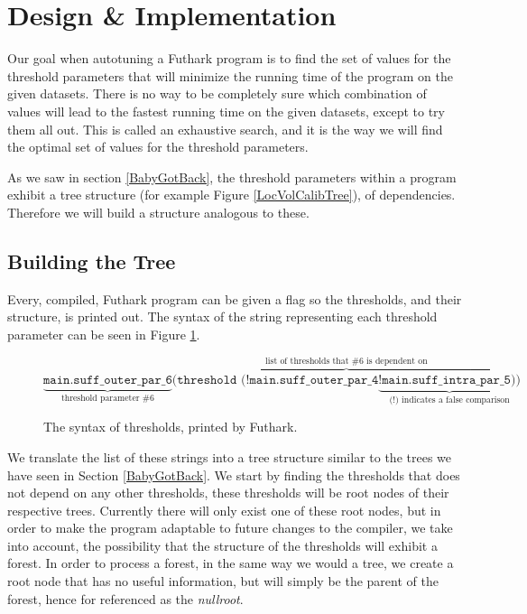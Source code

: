 \section{Design \& Implementation}
\label{imp}
Our goal when autotuning a Futhark program is to find the set of values for the
threshold parameters that will minimize the running time of the program on the
given datasets. There is no way to be completely sure
which combination of values will lead to the fastest running time on the given
datasets, except to try them all out. This is called an exhaustive search, and
it is the way we will find the optimal set of values for the threshold
parameters. 

As we saw in section \ref{BabyGotBack}, the threshold parameters within a program exhibit a tree structure (for example Figure \ref{LocVolCalibTree}), of dependencies. Therefore we will build a structure analogous to these.
%
\subsection{Building the Tree}
Every, compiled, Futhark program can be given a flag so the thresholds, and their structure, is printed out. The syntax of the string representing each threshold parameter
can be seen in Figure \ref{thresholdSyntax}.
\begin{figure}[h]
	$$\underbrace{\texttt{main.suff\_outer\_par\_6}}_\text{threshold parameter \#6} \overbrace{\texttt{(threshold (!main.suff\_outer\_par\_4} \underbrace{\texttt{!main.suff\_intra\_par\_5))}}_\text{(!) indicates a false comparison}}^\text{list of thresholds that \#6 is dependent on}$$
	\caption{The syntax of thresholds, printed by Futhark.}
	\label{thresholdSyntax}
\end{figure}
We translate the list of these strings into a tree structure similar to the
trees we have seen in Section \ref{BabyGotBack}. 
We start by finding the thresholds that does not depend on any other thresholds, 
these thresholds will be root nodes of their respective trees.
Currently there will only exist one of these root nodes, but in order to make the program
adaptable to future changes to the compiler, we take into account, the possibility that the
structure of the thresholds will exhibit a forest. In order to process a forest, in the same way we would a tree, 
we create a root node that has no useful information, but will simply be the
parent of the forest, hence for referenced as the \textit{nullroot}. \\

